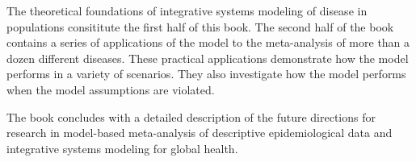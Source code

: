 The theoretical foundations of integrative systems modeling of disease
in populations consititute the first half of this book.  The second
half of the book contains a series of applications of the model to the
meta-analysis of more than a dozen different diseases.  These
practical applications demonstrate how the model performs in a variety
of scenarios. They also investigate how the model performs when the
model assumptions are violated.

The book concludes with a detailed description of the future
directions for research in model-based meta-analysis of descriptive
epidemiological data and integrative systems modeling for global
health.


